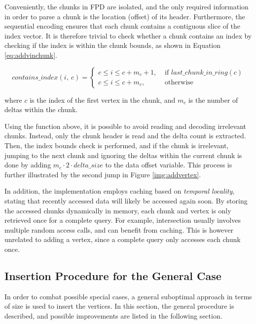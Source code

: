Conveniently, the chunks in FPD are isolated, and the only required information in order to parse a chunk is the location (offset) of its header. Furthermore, the sequential encoding ensures that each chunk contains a contiguous slice of the index vector. It is therefore trivial to check whether a chunk contains an index by checking if the index is within the chunk bounds, as shown in Equation \ref{eq:addvinchunk}.

\begin{equation}
contains\_index(i,\ c) = \begin{cases}c \leq i \leq c + m_c + 1, & \text { if } last\_chunk\_in\_ring(c) \\ c \leq i \leq c + m_c, & \text { otherwise }\end{cases}
\label{eq:addvinchunk}
\end{equation}

where $c$ is the index of the first vertex in the chunk, and $m_c$ is the number of deltas within the chunk.

Using the function above, it is possible to avoid reading and decoding irrelevant chunks. Instead, only the chunk header is read and the delta count is extracted. Then, the index bounds check is performed, and if the chunk is irrelevant, jumping to the next chunk and ignoring the deltas within the current chunk is done by adding $m_c \cdot 2 \cdot delta\_size$ to the data offset variable. This process is further illustrated by the second jump in Figure \ref{img:addvertex}.

In addition, the implementation employs caching based on \emph{temporal locality}, stating that recently accessed data will likely be accessed again soon. By storing the accessed chunks dynamically in memory, each chunk and vertex is only retrieved once for a complete query. For example, intersection usually involves multiple random access calls, and can benefit from caching. This is however unrelated to adding a vertex, since a complete query only accesses each chunk once.

\subsection{Insertion Procedure for the General Case}
In order to combat possible special cases, a general suboptimal approach in terms of size is used to insert the vertices. In this section, the general procedure is described, and possible improvements are listed in the following section.

